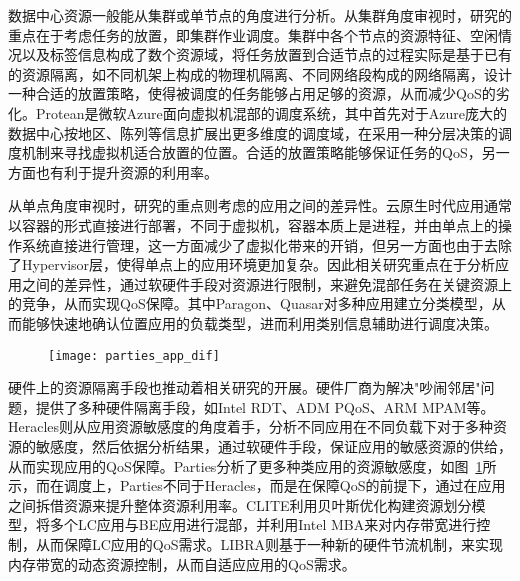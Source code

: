 数据中心资源一般能从集群或单节点的角度进行分析。从集群角度审视时，研究的重点在于考虑任务的放置，即集群作业调度。集群中各个节点的资源特征、空闲情况以及标签信息构成了数个资源域，将任务放置到合适节点的过程实际是基于已有的资源隔离，如不同机架上构成的物理机隔离、不同网络段构成的网络隔离，设计一种合适的放置策略，使得被调度的任务能够占用足够的资源，从而减少QoS的劣化。Protean\citep{hadary2020protean}是微软Azure面向虚拟机混部的调度系统，其中首先对于Azure庞大的数据中心按地区、陈列等信息扩展出更多维度的调度域，在采用一种分层决策的调度机制来寻找虚拟机适合放置的位置。合适的放置策略能够保证任务的QoS，另一方面也有利于提升资源的利用率。

从单点角度审视时，研究的重点则考虑的应用之间的差异性。云原生时代应用通常以容器的形式直接进行部署，不同于虚拟机，容器本质上是进程，并由单点上的操作系统直接进行管理，这一方面减少了虚拟化带来的开销，但另一方面也由于去除了Hypervisor层，使得单点上的应用环境更加复杂。因此相关研究重点在于分析应用之间的差异性，通过软硬件手段对资源进行限制，来避免混部任务在关键资源上的竞争，从而实现QoS保障。其中Paragon\citep{delimitrou2013paragon}、Quasar\citep{delimitrou2014quasar}对多种应用建立分类模型，从而能够快速地确认位置应用的负载类型，进而利用类别信息辅助进行调度决策。

\begin{figure}[!htbp]
    \centering
    \texttt{[image: parties\_app\_dif]}
    \label{fig:parties_app_dif}
\end{figure}

硬件上的资源隔离手段也推动着相关研究的开展。硬件厂商为解决"吵闹邻居"问题，提供了多种硬件隔离手段，如Intel RDT、ADM PQoS\citep{amdpqos}、ARM MPAM\citep{armmpam}等。Heracles\citep{lo2015heracles}则从应用资源敏感度的角度着手，分析不同应用在不同负载下对于多种资源的敏感度，然后依据分析结果，通过软硬件手段，保证应用的敏感资源的供给，从而实现应用的QoS保障。Parties\citep{chen2019parties}分析了更多种类应用的资源敏感度，如图~\ref{fig:parties_app_dif}所示，而在调度上，Parties不同于Heracles，而是在保障QoS的前提下，通过在应用之间拆借资源来提升整体资源利用率。CLITE\citep{patel2020clite}利用贝叶斯优化构建资源划分模型，将多个LC应用与BE应用进行混部，并利用Intel MBA来对内存带宽进行控制，从而保障LC应用的QoS需求。LIBRA\citep{zhang2021libra}则基于一种新的硬件节流机制，来实现内存带宽的动态资源控制，从而自适应应用的QoS需求。

